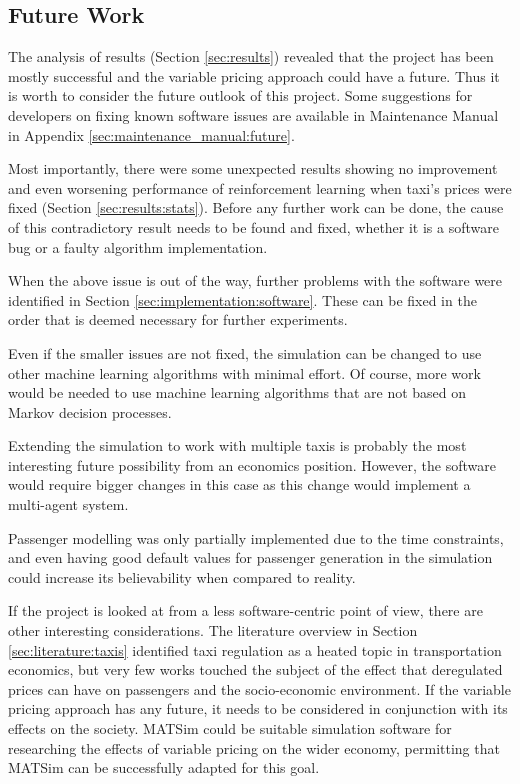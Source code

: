 \subsection{Future Work}

The analysis of results (Section \ref{sec:results}) revealed that the project
has been mostly successful and the variable pricing approach could have a
future. Thus it is worth to consider the future outlook of this project. Some
suggestions for developers on fixing known software issues are available in
Maintenance Manual in Appendix \ref{sec:maintenance_manual:future}.

Most importantly, there were some unexpected results showing no improvement and
even worsening performance of reinforcement learning when taxi's prices were
fixed (Section \ref{sec:results:stats}). Before any further work can be done,
the cause of this contradictory result needs to be found and fixed, whether it
is a software bug or a faulty algorithm implementation.

When the above issue is out of the way, further problems with the software were
identified in Section \ref{sec:implementation:software}. These can be fixed in
the order that is deemed necessary for further experiments. 

Even if the smaller issues are not fixed, the simulation can be changed to use
other machine learning algorithms with minimal effort. Of course, more work
would be needed to use machine learning algorithms that are not based on Markov
decision processes.

Extending the simulation to work with multiple taxis is probably the most
interesting future possibility from an economics position. However, the
software would require bigger changes in this case as this change would
implement a multi-agent system.

Passenger modelling was only partially implemented due to the time constraints,
and even having good default values for passenger generation in the simulation
could increase its believability when compared to reality.

If the project is looked at from a less software-centric point of view, there
are other interesting considerations. The literature overview in Section
\ref{sec:literature:taxis} identified taxi regulation as a heated topic in
transportation economics, but very few works touched the subject of the effect
that deregulated prices can have on passengers and the socio-economic
environment. If the variable pricing approach has any future, it needs to be
considered in conjunction with its effects on the society. MATSim could be
suitable simulation software for researching the effects of variable pricing on
the wider economy, permitting that MATSim can be successfully adapted for this
goal.
